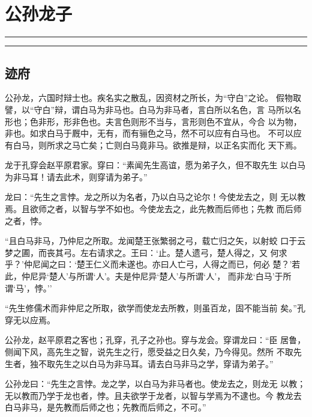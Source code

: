 \documentclass[]{article}
\date{}
\begin{document}
\hypertarget{header-n0}{%
\section{公孙龙子}\label{header-n0}}

\begin{center}\rule{0.5\linewidth}{\linethickness}\end{center}

\tableofcontents

\begin{center}\rule{0.5\linewidth}{\linethickness}\end{center}

\hypertarget{header-n10}{%
\subsection{迹府}\label{header-n10}}

公孙龙，六国时辩士也。疾名实之散乱，因资材之所长，为``守白''之论。
假物取譬，以``守白''辩，谓白马为非马也。白马为非马者，言白所以名色，言
马所以名形也；色非形，形非色也。夫言色则形不当与，言形则色不宜从，今合
以为物，非也。如求白马于厩中，无有，而有骊色之马，然不可以应有白马也。
不可以应有白马，则所求之马亡矣；亡则白马竟非马。欲推是辩，以正名实而化
天下焉。

龙于孔穿会赵平原君家。穿曰：``素闻先生高谊，愿为弟子久，但不取先生
以白马为非马耳！请去此术，则穿请为弟子。''

龙曰：``先生之言悖。龙之所以为名者，乃以白马之论尔！今使龙去之，则
无以教焉。且欲师之者，以智与学不如也。今使龙去之，此先教而后师也；先教
而后师之者，悖。

``且白马非马，乃仲尼之所取。龙闻楚王张繁弱之弓，载亡归之矢，以射蛟
口于云梦之圃，而丧其弓。左右请求之。王曰：`止。楚人遗弓，楚人得之，又
何求乎？'仲尼闻之曰：`楚王仁义而未遂也。亦曰人亡弓，人得之而已，何必
楚？'若此，仲尼异`楚人'与所谓`人'。夫是仲尼异`楚人'与所谓`人'，
而非龙`白马'于所谓`马'，悖。''

``先生修儒术而非仲尼之所取，欲学而使龙去所教，则虽百龙，固不能当前
矣。''孔穿无以应焉。

公孙龙，赵平原君之客也；孔穿，孔子之孙也。穿与龙会。穿谓龙曰：``臣
居鲁，侧闻下风，高先生之智，说先生之行，愿受益之日久矣，乃今得见。然所
不取先生者，独不取先生之以白马为非马耳。请去白马非马之学，穿请为弟子。''

公孙龙曰：``先生之言悖。龙之学，以白马为非马者也。使龙去之，则龙无
以教；无以教而乃学于龙也者，悖。且夫欲学于龙者，以智与学焉为不逮也。今
教龙去白马非马，是先教而后师之也；先教而后师之，不可。''
\end{document}
